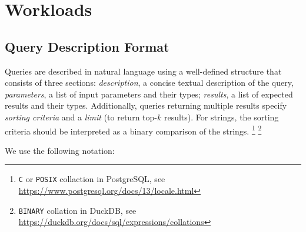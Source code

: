 \chapter{Workloads}
\label{sec:workloads}


\section{Query Description Format}
\label{sub:queries_structure}
Queries are described in natural language using a well-defined structure that consists of three sections:
\textit{description}, a concise textual description of the query,
\textit{parameters}, a list of input parameters and their types;
\textit{results}, a list of expected results and their types.
Additionally, queries returning multiple results specify \emph{sorting criteria} and a \emph{limit} (to return top-$k$ results).
For strings, the sorting criteria should be interpreted as a binary comparison of the strings.%
\footnote{\texttt{C} or \texttt{POSIX} collaction in PostgreSQL, see \url{https://www.postgresql.org/docs/13/locale.html}}%
\footnote{\texttt{BINARY} collation in DuckDB, see \url{https://duckdb.org/docs/sql/expressions/collations}}

We use the following notation:

